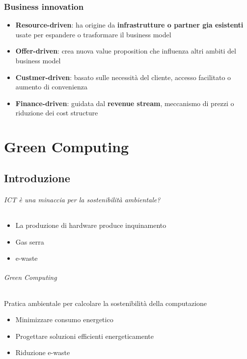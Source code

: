 \documentclass[a4paper, 12pt]{report}
\begin{document}
      \section{Business innovation}
        \begin{itemize}
          \item \textbf{Resource-driven}: ha origine da \textbf{infrastrutture o partner gia esistenti} usate per espandere o trasformare il business model 
          \item \textbf{Offer-driven}: crea nuova value proposition che influenza altri ambiti del business model
          \item \textbf{Custmer-driven}: basato sulle necessità del cliente, accesso facilitato o aumento di convenienza
          \item \textbf{Finance-driven}: guidata dal \textbf{revenue stream}, meccanismo di prezzi o riduzione dei cost structure
        \end{itemize}
  \part{Green Computing}
    \chapter{Introduzione}
    \paragraph{ICT è una minaccia per la sostenibilità ambientale?}
    \begin{itemize}
      \item La produzione di hardware produce inquinamento
      \item Gas serra
      \item e-waste
    \end{itemize}
    \paragraph{Green Computing}
    Pratica ambientale per calcolare la sostenibilità della computazione
    \begin{itemize}
      \item Minimizzare consumo energetico
      \item Progettare soluzioni efficienti energeticamente
      \item Riduzione e-waste
    \end{itemize}
\end{document}
